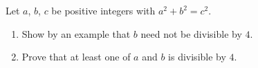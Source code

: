 Let $a$, $b$, $c$ be positive integers with $a^2+b^2=c^2$.
\begin{enumerate}
\item[(a)] Show by an example that $b$ need not be divisible by $4$.
\item[(b)] Prove that at least one of $a$ and $b$ is divisible by $4$.
\end{enumerate}
